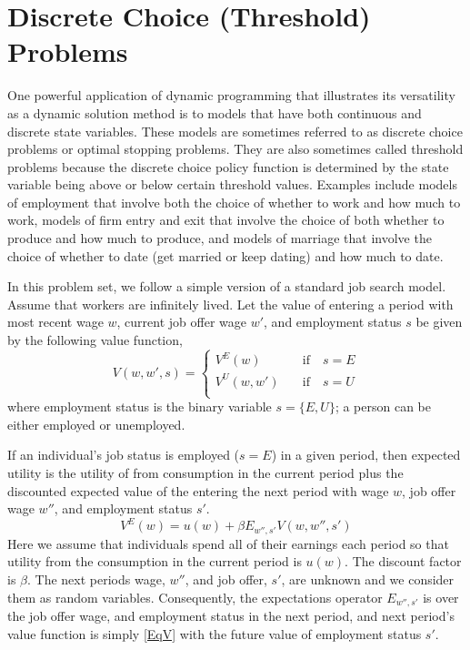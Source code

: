 \section{Discrete Choice (Threshold) Problems}\label{SecDiscrChoice}

One powerful application of dynamic programming that illustrates its versatility as a dynamic solution method is to models that have both continuous and discrete state variables. These models are sometimes referred to as discrete choice problems or optimal stopping problems. They are also sometimes called threshold problems because the discrete choice policy function is determined by the state variable being above or below certain threshold values. Examples include models of employment that involve both the choice of whether to work and how much to work, models of firm entry and exit that involve the choice of both whether to produce and how much to produce, and models of marriage that involve the choice of whether to date (get married or keep dating) and how much to date.

In this problem set, we follow a simple version of a standard job search model.  Assume that workers are infinitely lived. Let the value of entering a period with most recent wage $w$, current job offer wage $w'$, and employment status $s$ be given by the following value function,
\begin{equation}\label{EqV}
   V(w,w',s) = \begin{cases}
                  V^E(w)    \quad&\text{if}\quad s = E \\
                  V^U(w,w') \quad&\text{if}\quad s = U \\
               \end{cases}
\end{equation}
where employment status is the binary variable $s=\{E,U\}$; a person can be either employed or unemployed.

If an individual's job status is employed ($s = E$) in a given period, then expected utility is the utility of from consumption in the current period plus the discounted expected value of the entering the next period with wage $w$, job offer wage $w''$, and employment status $s'$.
\begin{equation}\label{EqVe1}
   V^E(w) = u(w) + \beta E_{w'',s'}V(w,w'',s')
\end{equation}
Here we assume that individuals spend all of their earnings each period so that utility from the consumption in the current period is $u(w)$.  The discount factor is $\beta$.  The next periods wage, $w''$, and job offer, $s'$, are unknown and we consider them as random variables.  Consequently, the expectations operator $E_{w'',s'}$ is over the job offer wage, and employment status in the next period, and next period's value function is simply \eqref{EqV} with the future value of employment status $s'$.

